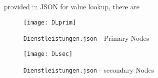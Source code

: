 %

provided in JSON for value lookup, there are

\begin{figure}[h!]
	\caption{\lstinline|Dienstleistungen.json|  - Primary Nodes}
	\texttt{[image: DLprim]}
\end{figure}

\begin{figure}[h]
	\caption{\lstinline|Dienstleistungen.json| - secondary Nodes}
	\texttt{[image: DLsec]}
\end{figure}

